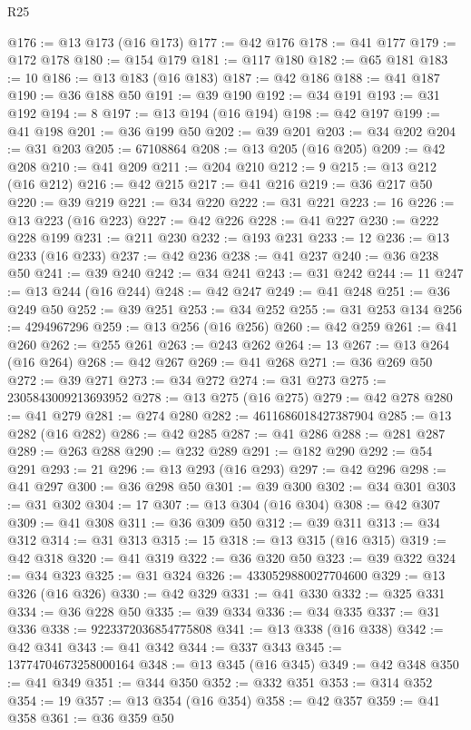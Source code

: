 \begin{lexlean}{R25}
\begin{coremodule}
@176 := @13 @173 (@16 @173)
@177 := @42 @176
@178 := @41 @177
@179 := @172 @178
@180 := @154 @179
@181 := @117 @180
@182 := @65 @181
@183 := 10
@186 := @13 @183 (@16 @183)
@187 := @42 @186
@188 := @41 @187
@190 := @36 @188 @50
@191 := @39 @190
@192 := @34 @191
@193 := @31 @192
@194 := 8
@197 := @13 @194 (@16 @194)
@198 := @42 @197
@199 := @41 @198
@201 := @36 @199 @50
@202 := @39 @201
@203 := @34 @202
@204 := @31 @203
@205 := 67108864
@208 := @13 @205 (@16 @205)
@209 := @42 @208
@210 := @41 @209
@211 := @204 @210
@212 := 9
@215 := @13 @212 (@16 @212)
@216 := @42 @215
@217 := @41 @216
@219 := @36 @217 @50
@220 := @39 @219
@221 := @34 @220
@222 := @31 @221
@223 := 16
@226 := @13 @223 (@16 @223)
@227 := @42 @226
@228 := @41 @227
@230 := @222 @228 @199
@231 := @211 @230
@232 := @193 @231
@233 := 12
@236 := @13 @233 (@16 @233)
@237 := @42 @236
@238 := @41 @237
@240 := @36 @238 @50
@241 := @39 @240
@242 := @34 @241
@243 := @31 @242
@244 := 11
@247 := @13 @244 (@16 @244)
@248 := @42 @247
@249 := @41 @248
@251 := @36 @249 @50
@252 := @39 @251
@253 := @34 @252
@255 := @31 @253 @134
@256 := 4294967296
@259 := @13 @256 (@16 @256)
@260 := @42 @259
@261 := @41 @260
@262 := @255 @261
@263 := @243 @262
@264 := 13
@267 := @13 @264 (@16 @264)
@268 := @42 @267
@269 := @41 @268
@271 := @36 @269 @50
@272 := @39 @271
@273 := @34 @272
@274 := @31 @273
@275 := 2305843009213693952
@278 := @13 @275 (@16 @275)
@279 := @42 @278
@280 := @41 @279
@281 := @274 @280
@282 := 4611686018427387904
@285 := @13 @282 (@16 @282)
@286 := @42 @285
@287 := @41 @286
@288 := @281 @287
@289 := @263 @288
@290 := @232 @289
@291 := @182 @290
@292 := @54 @291
@293 := 21
@296 := @13 @293 (@16 @293)
@297 := @42 @296
@298 := @41 @297
@300 := @36 @298 @50
@301 := @39 @300
@302 := @34 @301
@303 := @31 @302
@304 := 17
@307 := @13 @304 (@16 @304)
@308 := @42 @307
@309 := @41 @308
@311 := @36 @309 @50
@312 := @39 @311
@313 := @34 @312
@314 := @31 @313
@315 := 15
@318 := @13 @315 (@16 @315)
@319 := @42 @318
@320 := @41 @319
@322 := @36 @320 @50
@323 := @39 @322
@324 := @34 @323
@325 := @31 @324
@326 := 4330529880027704600
@329 := @13 @326 (@16 @326)
@330 := @42 @329
@331 := @41 @330
@332 := @325 @331
@334 := @36 @228 @50
@335 := @39 @334
@336 := @34 @335
@337 := @31 @336
@338 := 9223372036854775808
@341 := @13 @338 (@16 @338)
@342 := @42 @341
@343 := @41 @342
@344 := @337 @343
@345 := 13774704673258000164
@348 := @13 @345 (@16 @345)
@349 := @42 @348
@350 := @41 @349
@351 := @344 @350
@352 := @332 @351
@353 := @314 @352
@354 := 19
@357 := @13 @354 (@16 @354)
@358 := @42 @357
@359 := @41 @358
@361 := @36 @359 @50

\end{coremodule}
\end{lexlean}
